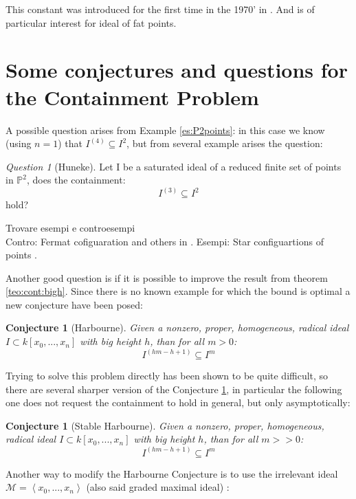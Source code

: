 \documentclass[]{book}
\theoremstyle{plain}
\newtheorem{conj}[teo]{Conjecture}
\theoremstyle{remark}
\newtheorem{que}[rem]{Question}
\theoremstyle{definition}
\newcommand{\PP}{\mathbb{P}}
\newcommand{\MM}{\mathcal{M}}
\newcommand{\cont}[2]{ I^{(#1)} \subseteq I^{#2}}
\begin{document}
This constant was introduced for the first time in the 1970' in \cite{Wald77}. And is of particular interest for ideal of fat points. 

\section{Some conjectures and questions for the Containment Problem}
	A possible question arises from Example \ref{es:P2points}: in this case we know (using $ n=1 $) that $  \cont{4}{2}$, but from several example arises the question:
	\begin{que}[Huneke] \label{que:32}
	Let I be a saturated ideal of a reduced finite set of points in $ \PP^2 $, does the containment:
	\[ \cont{3}{2} \]
	hold?
	\end{que}
	
	\begin{tcolorbox}
	Trovare esempi e controesempi\\
	Contro: Fermat cofiguaration and others in \cite{DSTG13}. 
	Esempi: Star configuartions of points \cite{Har11}.
	\end{tcolorbox}
	
	Another good question is if it is possible to improve the result from theorem \ref{teo:cont:bigh}. Since there is no known example for which the bound is optimal a new conjecture have been posed:
	
	\begin{conj}[Harbourne]\label{conj:harb}
		Given a nonzero, proper, homogeneous, radical ideal $ I \subset k[x_0 , ... , x_n] $ with big height $ h $, than for all $ m > 0 $:
		\[
		\cont{hm - h +1}{m}
		\]
	\end{conj}
	
	Trying to solve this problem directly has been shown to be quite difficult, so there are several  sharper version of the Conjecture \ref{conj:harb}, in particular the following one does not request the containment to hold in general, but only asymptotically:
	
	\begin{conj}[Stable Harbourne]\label{conj:stabharb}
			Given a nonzero, proper, homogeneous, radical ideal $ I \subset k[x_0 , ... , x_n] $ with big height $ h $, than for all $ m >> 0 $:
			\[
			\cont{hm - h +1}{m}
			\]
	\end{conj} 
	
	Another way to modify the Harbourne Conjecture is to use the irrelevant ideal $ \MM=\left\langle x_0 , ... ,x_n \right> $ (also said graded maximal ideal) : 
	
\end{document}
